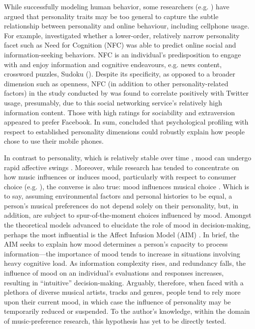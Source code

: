 \documentclass[a4paper]{article}
\begin{document}
While successfully modeling human behavior, some researchers (e.g. \cite{ross2009personality}) have argued that personality traits may be too general to capture the subtle relationship between personality and online behaviour, including cellphone usage. For example, \cite{hughes2012tale} investigated whether a lower-order, relatively narrow personality facet such as Need for Cognition (NFC) was able to predict online social and information-seeking behaviors. NFC is an individual’s predisposition to engage with and enjoy information and cognitive endeavours, e.g. news content, crossword puzzles, Sudoku (\cite{verplanken1993need, haugtvedt1992need}). Despite its specificity, as opposed to a broader dimension such as openness, NFC (in addition to other personality-related factors) in the study conducted by \cite{hughes2012tale} was found to correlate positively with Twitter usage, presumably, due to this social networking service’s relatively high information content. Those with high ratings for sociability and extraversion appeared to prefer Facebook. In sum, \cite{butt2008personality} concluded that psychological profiling with respect to established personality dimensions could robustly explain how people chose to use their mobile phones.

In contrast to personality, which is relatively stable over time \cite{leon1979personality}, mood can undergo rapid affective swings \cite{mcfarlane1988mood}. Moreover, while research has tended to concentrate on how music influences or induces mood, particularly with respect to consumer choice (e.g. \cite{north1999influence, kim1993influence,turley2000atmospheric,areni1993influence}), the converse is also true: mood influences musical choice \cite{friedman2012re}. Which is to say, assuming environmental factors and personal histories to be equal, a person’s musical preferences do not depend solely on their personality, but, in addition, are subject to spur-of-the-moment choices influenced by mood. Amongst the theoretical models advanced to elucidate the role of mood in decision-making, perhaps the most influential is the Affect Infusion Model (AIM) \cite{forgas1995mood}. In brief, the AIM seeks to explain how mood determines a person’s capacity to process information—the importance of mood tends to increase in situations involving heavy cognitive load. As information complexity rises, and redundancy falls, the influence of mood on an individual’s evaluations and responses increases, resulting in “intuitive” decision-making. Arguably, therefore, when faced with a plethora of diverse musical artists, tracks and genres, people tend to rely more upon their current mood, in which case the influence of personality may be temporarily reduced or suspended. To the author's knowledge, within the domain of music-preference research, this hypothesis has yet to be directly tested. 
\end{document}
